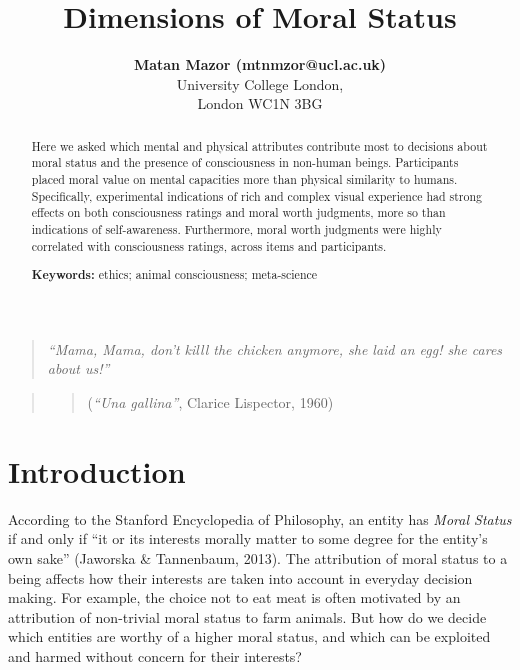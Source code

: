 \documentclass[10pt, letterpaper]{article}
\title{Dimensions of Moral Status}
\author{{\large \bf Matan Mazor (mtnmzor@ucl.ac.uk)}  \AND {\large \bf Arianna Risoli (arianna.risoli.18@ucl.ac.uk)  \large \bf Anna Eberhardt (anna.everhardt.18@ucl.ac.uk)} \AND {\large \bf Stephen M. Fleming (stephen.fleming@ucl.ac.uk)} \\ University College London, \\ London WC1N 3BG}
\begin{document}
\maketitle

\begin{abstract}
Here we asked which mental and physical attributes contribute most to
decisions about moral status and the presence of consciousness in
non-human beings. Participants placed moral value on mental capacities
more than physical similarity to humans. Specifically, experimental
indications of rich and complex visual experience had strong effects on
both consciousness ratings and moral worth judgments, more so than
indications of self-awareness. Furthermore, moral worth judgments were
highly correlated with consciousness ratings, across items and
participants.

\textbf{Keywords:}
ethics; animal consciousness; meta-science
\end{abstract}

\begin{quote}
\emph{``Mama, Mama, don't killl the chicken anymore, she laid an egg!
she cares about us!''}
\end{quote}

\begin{quote}
\begin{quote}
(\emph{``Una gallina''}, Clarice Lispector, 1960)
\end{quote}
\end{quote}

\hypertarget{introduction}{%
\section{Introduction}\label{introduction}}

According to the Stanford Encyclopedia of Philosophy, an entity has
\emph{Moral Status} if and only if ``it or its interests morally matter
to some degree for the entity's own sake'' (Jaworska \& Tannenbaum,
2013). The attribution of moral status to a being affects how their
interests are taken into account in everyday decision making. For
example, the choice not to eat meat is often motivated by an attribution
of non-trivial moral status to farm animals. But how do we decide which
entities are worthy of a higher moral status, and which can be exploited
and harmed without concern for their interests?
\end{document}
